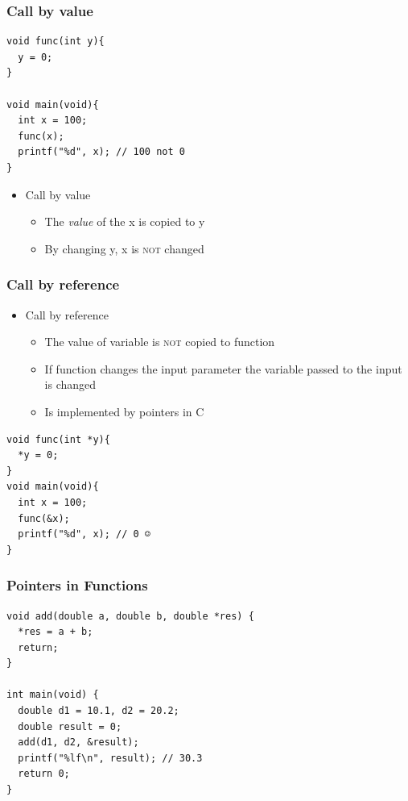 \documentclass{../c-lecture}
\begin{document}
\begin{frame}[fragile]
  \frametitle{Call by value}
  \begin{verbatim}
void func(int y){
  y = 0;
}

void main(void){
  int x = 100;
  func(x);
  printf("%d", x); // 100 not 0
}
  \end{verbatim}
  \begin{itemize}
    \item Call by value
    \begin{itemize}
      \item The \textit{\color{YellowOrange} value} of the x is copied to y
      \item By changing y, x is \textsc{\color{RubineRed} not} changed
    \end{itemize}
  \end{itemize}
\end{frame}

\begin{frame}[fragile]
  \frametitle{Call by reference}
  \begin{itemize}
    \item Call by reference
    \begin{itemize}
      \item
        The value of variable is \textsc{\color{RubineRed}not} copied to
        function
      \item
        If function changes the input parameter \textrightarrow the variable passed to
        the input is changed
      \item Is implemented by pointers in C
    \end{itemize}
  \end{itemize}
  \begin{verbatim}
void func(int *y){
  *y = 0;
}
void main(void){
  int x = 100;
  func(&x);
  printf("%d", x); // 0 ☺️
}
  \end{verbatim}
\end{frame}

\begin{frame}[fragile]
  \frametitle{Pointers in Functions}
  \begin{verbatim}
void add(double a, double b, double *res) {
  *res = a + b;
  return;
}

int main(void) {
  double d1 = 10.1, d2 = 20.2;
  double result = 0;
  add(d1, d2, &result);
  printf("%lf\n", result); // 30.3
  return 0;
}
  \end{verbatim}
\end{frame}
\end{document}
